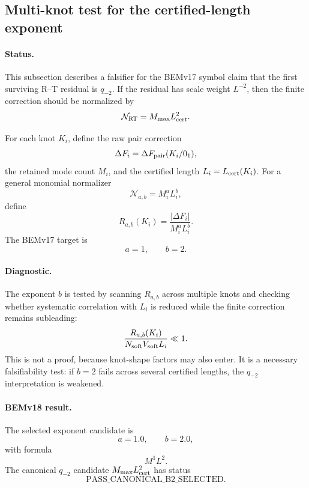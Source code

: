 
\subsection{Multi-knot test for the certified-length exponent}

\paragraph{Status.}
This subsection describes a falsifier for the BEMv17 symbol claim that the
first surviving R--T residual is \(q_{-2}\).  If the residual has scale weight
\(L^{-2}\), then the finite correction should be normalized by
\[
\mathcal N_{\rm RT}=M_{\max}L_{\rm cert}^{2}.
\]

For each knot \(K_i\), define the raw pair correction
\[
\Delta F_i=\Delta F_{\rm pair}(K_i/0_1),
\]
the retained mode count \(M_i\), and the certified length \(L_i=L_{\rm cert}(K_i)\).
For a general monomial normalizer
\[
\mathcal N_{a,b}=M_i^a L_i^b,
\]
define
\[
R_{a,b}(K_i)=
\frac{|\Delta F_i|}
{M_i^aL_i^b}.
\]
The BEMv17 target is
\[
a=1,\qquad b=2.
\]

\paragraph{Diagnostic.}
The exponent \(b\) is tested by scanning \(R_{a,b}\) across multiple knots and
checking whether systematic correlation with \(L_i\) is reduced while the
finite correction remains subleading:
\[
\frac{R_{a,b}(K_i)}
{N_{\rm soft}V_{\rm soft}L_i}
\ll 1.
\]
This is not a proof, because knot-shape factors may also enter.  It is a
necessary falsifiability test: if \(b=2\) fails across several certified
lengths, the \(q_{-2}\) interpretation is weakened.

\paragraph{BEMv18 result.}
The selected exponent candidate is
\[
a=1.0,\qquad b=2.0,
\]
with formula
\[
M^1 L^2.
\]
The canonical \(q_{-2}\) candidate \(M_{\max}L_{\rm cert}^{2}\) has status
\[
\boxed{\text{PASS_CANONICAL_B2_SELECTED}}.
\]
